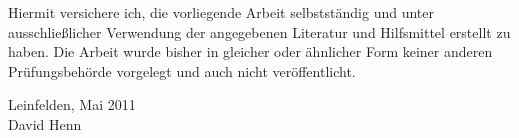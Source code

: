 Hiermit versichere ich, die vorliegende Arbeit selbstständig und unter ausschließlicher
Verwendung der angegebenen Literatur und Hilfsmittel erstellt zu haben.
Die Arbeit wurde bisher in gleicher oder ähnlicher Form keiner anderen Prüfungsbehörde
vorgelegt und auch nicht veröffentlicht.




\vspace{7cm}

Leinfelden, Mai 2011
\\David Henn
